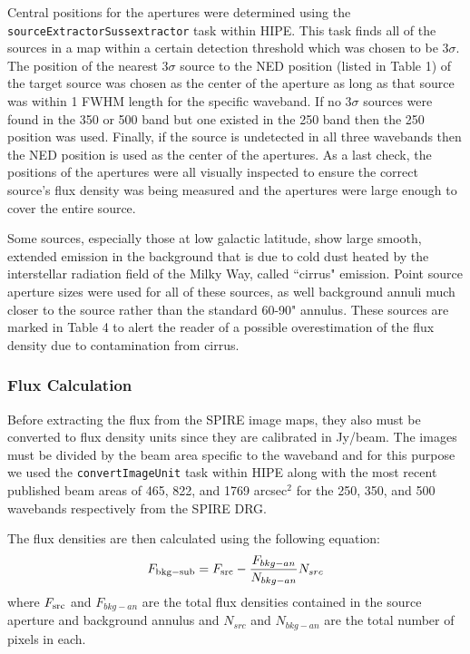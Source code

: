 Central positions for the apertures were determined using the \texttt{sourceExtractorSussextractor} task within HIPE. This task finds all of the sources in a map within a certain detection threshold which was chosen to be $3\sigma$. The position of the nearest $3\sigma$ source to the NED position (listed in Table 1) of the target source was chosen as the center of the aperture as long as that source was within 1 FWHM length for the specific waveband. If no $3\sigma$ sources were found in the 350 or 500 \um{} band but one existed in the 250 \um{} band then the 250 \um{} position was used. Finally, if the source is undetected in all three wavebands then the NED position is used as the center of the apertures. As a last check, the positions of the apertures were all visually inspected to ensure the correct source's flux density was being measured and the apertures were large enough to cover the entire source.

Some sources, especially those at low galactic latitude, show large smooth, extended emission in the background that is due to cold dust heated by the interstellar radiation field of the Milky Way, called ``cirrus" emission. Point source aperture sizes were used for all of these sources, as well background annuli much closer to the source rather than the standard 60-90" annulus. These sources are marked in Table 4 to alert the reader of a possible overestimation of the flux density due to contamination from cirrus.

\subsubsection{Flux Calculation}
Before extracting the flux from the SPIRE image maps, they also must be converted to flux density units since they are calibrated in Jy/beam. The images must be divided by the beam area specific to the waveband and for this purpose we used the \texttt{convertImageUnit} task within HIPE along with the most recent published beam areas of 465, 822, and 1769 arcsec$^{2}$ for the 250, 350, and 500 \um{} wavebands respectively from the SPIRE DRG.

The flux densities are then calculated using the following equation:
\begin{equation}
F_{\rm{bkg-sub}} = F_{\rm{src}} - \frac{F_{bkg-an}}{N_{bkg-an}}N_{src}
\end{equation}
where $F_{\rm{src}}$ and $F_{bkg-an}$ are the total flux densities contained in the source aperture and background annulus and $N_{src}$ and $N_{bkg-an}$ are the total number of pixels in each.

